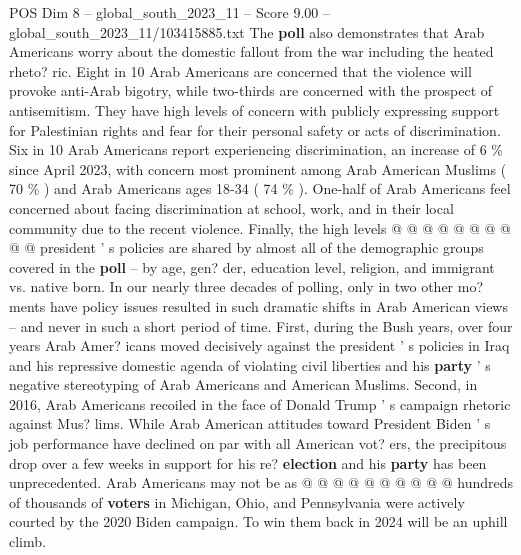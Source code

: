 \begin{textsample}{POS Dim 8 – global\_south\_2023\_11 – Score 9.00 – global\_south\_2023\_11/103415885.txt}
The \textbf{poll} also demonstrates that Arab Americans worry about the domestic fallout from the war including the heated rheto? ric.
Eight in 10 Arab Americans are concerned that the violence will provoke anti-Arab bigotry, while two-thirds are concerned with the prospect of antisemitism.
They have high levels of concern with publicly expressing support for Palestinian rights and fear for their personal safety or acts of discrimination.
Six in 10 Arab Americans report experiencing discrimination, an increase of 6 \% since April 2023, with concern most prominent among Arab American Muslims ( 70 \% ) and Arab Americans ages 18-34 ( 74 \% ).
One-half of Arab Americans feel concerned about facing discrimination at school, work, and in their local community due to the recent violence.
Finally, the high levels @ @ @ @ @ @ @ @ @ @ president ' s policies are shared by almost all of the demographic groups covered in the \textbf{poll} -- by age, gen? der, education level, religion, and immigrant vs. native born.
In our nearly three decades of polling, only in two other mo? ments have policy issues resulted in such dramatic shifts in Arab American views -- and never in such a short period of time.
First, during the Bush years, over four years Arab Amer? icans moved decisively against the president ' s policies in Iraq and his repressive domestic agenda of violating civil liberties and his \textbf{party} ' s negative stereotyping of Arab Americans and American Muslims.
Second, in 2016, Arab Americans recoiled in the face of Donald Trump ' s campaign rhetoric against Mus? lims.
While Arab American attitudes toward President Biden ' s job performance have declined on par with all American vot? ers, the precipitous drop over a few weeks in support for his re? \textbf{election} and his \textbf{party} has been unprecedented.
Arab Americans may not be as @ @ @ @ @ @ @ @ @ @ hundreds of thousands of \textbf{voters} in Michigan, Ohio, and Pennsylvania were actively courted by the 2020 Biden campaign.
To win them back in 2024 will be an uphill climb.

\end{textsample}
